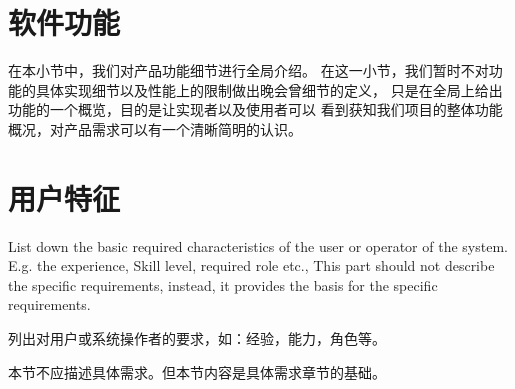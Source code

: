 






\section{软件功能}

在本小节中，我们对\proname 产品功能细节进行全局介绍。
在这一小节，我们暂时不对功能的具体实现细节以及性能上的限制做出晚会曾细节的定义，
    只是在全局上给出功能的一个概览，目的是让实现者以及使用者可以
    看到获知我们项目的整体功能概况，对产品需求可以有一个清晰简明的认识。




\section{用户特征}
List down the basic required characteristics of the user or operator of the system. E.g. the experience, Skill level, required role etc.,
This part should not describe the specific requirements, instead, it provides the basis for the specific requirements.

列出对用户或系统操作者的要求，如：经验，能力，角色等。

本节不应描述具体需求。但本节内容是具体需求章节的基础。


